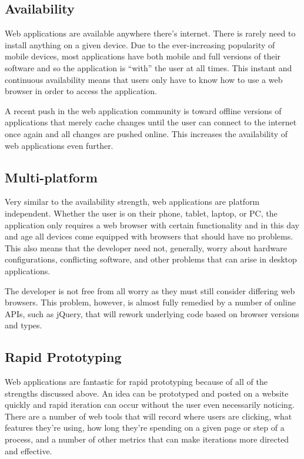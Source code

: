 \documentclass[12pt]{ucthesis}
\begin{document}
\subsection{Availability}
Web applications are available anywhere there's internet. There is rarely need to install anything on a given device. Due to the ever-increasing popularity of mobile devices, most applications have both mobile and full versions of their software and so the application is ``with'' the user at all times. This instant and continuous availability means that users only have to know how to use a web browser in order to access the application.

A recent push in the web application community is toward offline versions of applications that merely cache changes until the user can connect to the internet once again and all changes are pushed online. This increases the availability of web applications even further.

\subsection{Multi-platform}
Very similar to the availability strength, web applications are platform independent. Whether the user is on their phone, tablet, laptop, or PC, the application only requires a web browser with certain functionality and in this day and age all devices come equipped with browsers that should have no problems. This also means that the developer need not, generally, worry about hardware configurations, conflicting software, and other problems that can arise in desktop applications. 

The developer is not free from all worry as they must still consider differing web browsers. This problem, however, is almost fully remedied by a number of online APIs, such as jQuery\cite{jQuery}, that will rework underlying code based on browser versions and types. 

\subsection{Rapid Prototyping}
Web applications are fantastic for rapid prototyping because of all of the strengths discussed above. An idea can be prototyped and posted on a website quickly and rapid iteration can occur without the user even necessarily noticing. There are a number of web tools that will record where users are clicking, what features they're using, how long they're spending on a given page or step of a process, and a number of other metrics that can make iterations more directed and effective.
\end{document}
